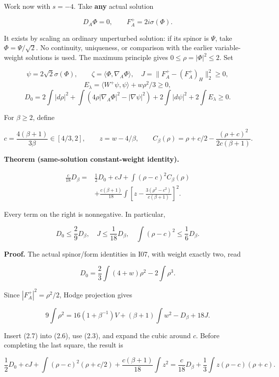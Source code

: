 \documentclass[
  11pt,
]{article}
\begin{document}
Work now with \(s=-4\). Take \textbf{any} actual solution

\[
 D_A\Phi=0,\qquad F_A^+=2i\sigma(\Phi).
 \tag{2.1}
\]

It exists by scaling an ordinary unperturbed solution: if its spinor is
\(\Psi\), take \(\Phi=\Psi/\sqrt2\). No continuity, uniqueness, or
comparison with the earlier variable-weight solutions is used. The
maximum principle gives \(0\le\rho=|\Phi|^2\le2\). Set

\[
 \psi=2\sqrt2\sigma(\Phi),\qquad
 \zeta=\langle\Phi,\nabla_A\Phi\rangle,
 \quad J=\|F_A^+-(F_A^+)_H\|_2^2\ge0,
\] \[
 E_\lambda=\langle W^+\psi,\psi\rangle+w\rho^2/3\ge0,
\] \[
 D_0=2\int|d\rho|^2+
 \int(4\rho|\nabla_A\Phi|^2-|\nabla\psi|^2)
       +2\int|d\psi|^2+2\int E_\lambda\ge0.
 \tag{2.2}
\]

For \(\beta\ge2\), define

\[
 c=\frac{4(\beta+1)}{3\beta}\in[4/3,2],\qquad
 z=w-4/\beta,\qquad
 C_\beta(\rho)=\rho+c/2-\frac{(\rho+c)^2}{2c(\beta+1)}.
 \tag{2.3}
\]

\textbf{Theorem (same-solution constant-weight identity).}

\[
\boxed{\begin{aligned}
 \frac{c}{18}D_\beta={}&\frac12D_0+cJ
       +\int(\rho-c)^2 C_\beta(\rho)\\
 &+\frac{c(\beta+1)}{18}
       \int\left[z-\frac{3(\rho^2-c^2)}{c(\beta+1)}\right]^2.
\end{aligned}}
 \tag{2.4}
\]

Every term on the right is nonnegative. In particular,

\[
 \boxed{D_0\le\frac29D_\beta,\quad
 J\le\frac1{18}D_\beta,\quad
 \int(\rho-c)^2\le\frac16D_\beta.}
 \tag{2.5}
\]

\textbf{Proof.} The actual spinor/form identities in I07, with weight
exactly two, read

\[
 D_0=\frac23\int(4+w)\rho^2-2\int\rho^3.
 \tag{2.6}
\]

Since \(|F_A^+|^2=\rho^2/2\), Hodge projection gives

\[
 9\int\rho^2
 =16(1+\beta^{-1})V+(\beta+1)\int w^2-D_\beta+18J.
 \tag{2.7}
\]

Insert (2.7) into (2.6), use (2.3), and expand the cubic around \(c\).
Before completing the last square, the result is

\[
 \frac12D_0+cJ+\int(\rho-c)^2(\rho+c/2)
  +\frac{c(\beta+1)}{18}\int z^2
 =\frac c{18}D_\beta+\frac13\int z(\rho-c)(\rho+c).
 \tag{2.8}
\]
\end{document}
